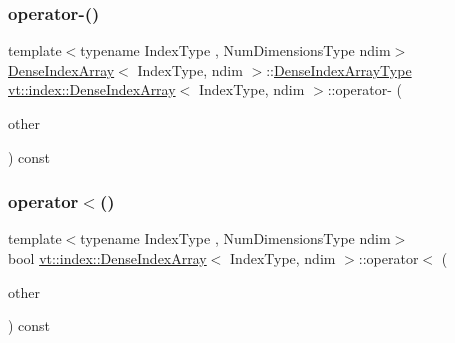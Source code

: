 \mbox{\label{structvt_1_1index_1_1_dense_index_array_a828670d9617980741517481c39b8212f}} 
\subsubsection{\texorpdfstring{operator-\/()}{operator-()}}
{\footnotesize\ttfamily template$<$typename Index\+Type , Num\+Dimensions\+Type ndim$>$ \\
\hyperlink{structvt_1_1index_1_1_dense_index_array}{Dense\+Index\+Array}$<$ Index\+Type, ndim $>$\+::\hyperlink{structvt_1_1index_1_1_dense_index_array_aec95c4ed1b4071d31d24142f02429dbd}{Dense\+Index\+Array\+Type} \hyperlink{structvt_1_1index_1_1_dense_index_array}{vt\+::index\+::\+Dense\+Index\+Array}$<$ Index\+Type, ndim $>$\+::operator-\/ (\begin{DoxyParamCaption}\item[{\hyperlink{structvt_1_1index_1_1_dense_index_array_aec95c4ed1b4071d31d24142f02429dbd}{Dense\+Index\+Array\+Type} const \&}]{other }\end{DoxyParamCaption}) const}

\mbox{\label{structvt_1_1index_1_1_dense_index_array_a7d1d02c9c0a50822d63afeb3358a7a0f}} 
\subsubsection{\texorpdfstring{operator$<$()}{operator<()}}
{\footnotesize\ttfamily template$<$typename Index\+Type , Num\+Dimensions\+Type ndim$>$ \\
bool \hyperlink{structvt_1_1index_1_1_dense_index_array}{vt\+::index\+::\+Dense\+Index\+Array}$<$ Index\+Type, ndim $>$\+::operator$<$ (\begin{DoxyParamCaption}\item[{\hyperlink{structvt_1_1index_1_1_dense_index_array_aec95c4ed1b4071d31d24142f02429dbd}{Dense\+Index\+Array\+Type} const \&}]{other }\end{DoxyParamCaption}) const}

